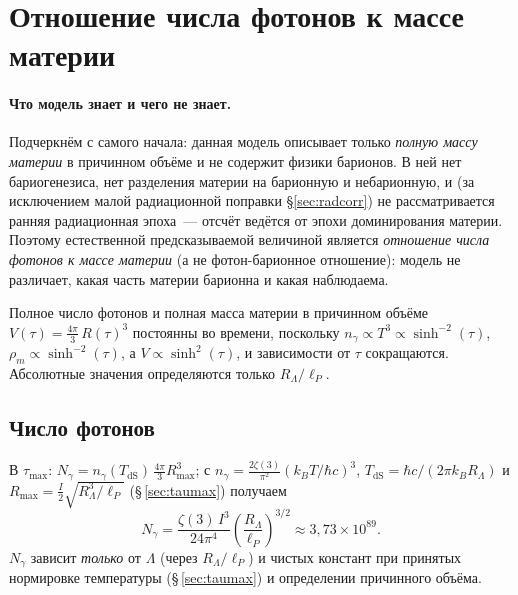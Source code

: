 \documentclass[12pt,a4paper]{article}
\begin{document}
\section{Отношение числа фотонов к массе материи}
\label{sec:photon_matter}

\paragraph{Что модель знает и чего не знает.} Подчеркнём с самого начала: данная модель описывает только \emph{полную массу материи} в причинном объёме и не содержит физики барионов. В ней нет бариогенезиса, нет разделения материи на барионную и небарионную, и (за исключением малой радиационной поправки \S\ref{sec:radcorr}) не рассматривается ранняя радиационная эпоха~--- отсчёт ведётся от эпохи доминирования материи. Поэтому естественной предсказываемой величиной является \emph{отношение числа фотонов к массе материи} (а не фотон-барионное отношение): модель не различает, какая часть материи барионна и какая наблюдаема.

Полное число фотонов и полная масса материи в причинном объёме $V(\tau) = \frac{4\pi}{3}\,R(\tau)^3$ постоянны во времени, поскольку $n_\gamma\propto T^3\propto\sinh^{-2}(\tau)$, $\rho_m\propto\sinh^{-2}(\tau)$, а $V\propto\sinh^2(\tau)$, и зависимости от $\tau$ сокращаются. Абсолютные значения определяются только $R_\Lambda/\ell_P$.

\subsection{Число фотонов}
В $\tau_{\max}$: $N_\gamma=n_\gamma(T_{\mathrm{dS}})\,\tfrac{4\pi}{3}R_{\max}^3$; с $n_\gamma=\tfrac{2\zeta(3)}{\pi^2}(k_BT/\hbar c)^3$, $T_{\mathrm{dS}}=\hbar c/(2\pi k_B R_\Lambda)$ и $R_{\max}=\tfrac{I}{2}\sqrt{R_\Lambda^3/\ell_P}$ (\S\,\ref{sec:taumax}) получаем
\begin{equation}
\boxed{N_\gamma = \frac{\zeta(3)\,I^3}{24\pi^4} \left(\frac{R_\Lambda}{\ell_P}\right)^{3/2} \approx 3{,}73 \times 10^{89}.} \label{eq:n_gamma}
\end{equation}
$N_\gamma$ зависит \emph{только} от $\Lambda$ (через $R_\Lambda/\ell_P$) и чистых констант при принятых нормировке температуры (\S\,\ref{sec:taumax}) и определении причинного объёма.
\end{document}
